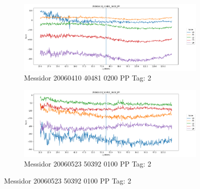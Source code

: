\begin{figure}[ht!]
	\centering
	\begin{subfigure}[b]{ 0.85\textwidth}
		\centering
		\includegraphics[width=\textwidth]{Figures/chapter_stability/20060410_40481_0200_PP/l/scores.png}
		\caption{Messidor 20060410 40481 0200 PP Tag: 2}		
	\end{subfigure}
	\begin{subfigure}[b]{ 0.85\textwidth}
		\centering
		\includegraphics[width=\textwidth]{Figures/chapter_stability/20060523_50392_0100_PP/l/scores.png}
		\caption{Messidor 20060523 50392 0100 PP Tag: 2}		
	\end{subfigure}
	

\end{figure}
